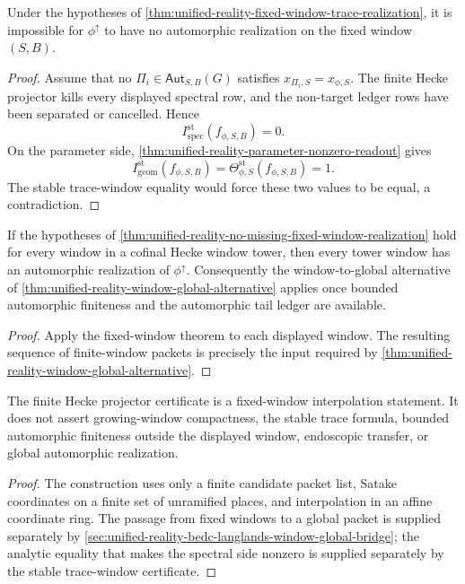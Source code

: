 \begin{theorem}
\label{thm:unified-reality-no-missing-fixed-window-realization}
Under the hypotheses of
\autoref{thm:unified-reality-fixed-window-trace-realization}, it is
impossible for $\phi^{\uparrow}$ to have no automorphic realization on
the fixed window $(S,B)$.
\end{theorem}
\begin{proof}
Assume that no $\Pi_i\in\mathsf{Aut}_{S,B}(G)$ satisfies
$x_{\Pi_i,S}=x_{\phi,S}$. The finite Hecke projector kills every
displayed spectral row, and the non-target ledger rows have been
separated or cancelled. Hence
$$
I_{\mathrm{spec}}^{\mathrm{st}}(f_{\phi,S,B})=0.
$$
On the parameter side,
\autoref{thm:unified-reality-parameter-nonzero-readout} gives
$$
I_{\mathrm{geom}}^{\mathrm{st}}(f_{\phi,S,B})
=
\Theta_{\phi,S}^{\mathrm{st}}(f_{\phi,S,B})
=1.
$$
The stable trace-window equality would force these two values to be
equal, a contradiction.
\end{proof}

\begin{corollary}
\label{cor:unified-reality-projector-input-cofinal-bridge}
If the hypotheses of
\autoref{thm:unified-reality-no-missing-fixed-window-realization} hold
for every window in a cofinal Hecke window tower, then every tower
window has an automorphic realization of $\phi^{\uparrow}$. Consequently
the window-to-global alternative of
\autoref{thm:unified-reality-window-global-alternative} applies once
bounded automorphic finiteness and the automorphic tail ledger are
available.
\end{corollary}
\begin{proof}
Apply the fixed-window theorem to each displayed window. The resulting
sequence of finite-window packets is precisely the input required by
\autoref{thm:unified-reality-window-global-alternative}.
\end{proof}

\begin{theorem}
\label{thm:unified-reality-finite-projector-boundary}
The finite Hecke projector certificate is a fixed-window interpolation
statement. It does not assert growing-window compactness, the stable
trace formula, bounded automorphic finiteness outside the displayed
window, endoscopic transfer, or global automorphic realization.
\end{theorem}
\begin{proof}
The construction uses only a finite candidate packet list, Satake
coordinates on a finite set of unramified places, and interpolation in
an affine coordinate ring. The passage from fixed windows to a global
packet is supplied separately by
\autoref{sec:unified-reality-bedc-langlands-window-global-bridge}; the
analytic equality that makes the spectral side nonzero is supplied
separately by the stable trace-window certificate.
\end{proof}
